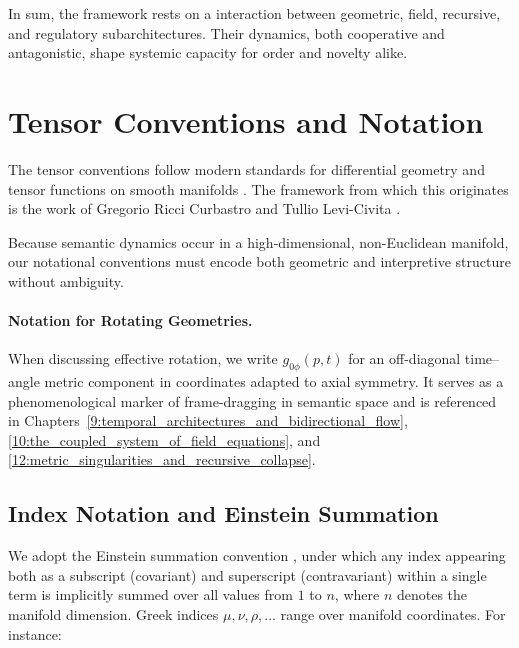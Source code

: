 In sum, the framework rests on a interaction between geometric, field, recursive, and regulatory subarchitectures. Their dynamics, both cooperative and antagonistic, shape systemic capacity for order and novelty alike.


\section{Tensor Conventions and Notation}
\label{2.4:tensor_conventions_and_notation}

The tensor conventions follow modern standards for differential geometry and tensor functions on smooth manifolds \autocite{Lee2012, MisnerThorneWheeler1973}. The framework from which this originates is the work of Gregorio Ricci Curbastro and Tullio Levi-Civita \autocite{RicciLeviCivita1901}.

Because semantic dynamics occur in a high-dimensional, non-Euclidean manifold, our notational conventions must encode both geometric and interpretive structure without ambiguity.

\paragraph{Notation for Rotating Geometries.} When discussing effective rotation, we write \(g_{0\phi}(p,t)\) for an off-diagonal time–angle metric component in coordinates adapted to axial symmetry. It serves as a phenomenological marker of frame-dragging in semantic space and is referenced in Chapters~\ref{9:temporal_architectures_and_bidirectional_flow}, \ref{10:the_coupled_system_of_field_equations}, and \ref{12:metric_singularities_and_recursive_collapse}.

\subsection{Index Notation and Einstein Summation}
\label{2.4.1:index_notation_and_einstein_summation}

We adopt the Einstein summation convention \autocite{Einstein1916}, under which any index appearing both as a subscript (covariant) and superscript (contravariant) within a single term is implicitly summed over all values from \(1\) to \(n\), where \(n\) denotes the manifold dimension. Greek indices \(\mu,\nu,\rho,\ldots\) range over manifold coordinates. For instance:


